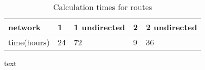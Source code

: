 

\begin{table}[]
\centering
\begin{tabular}{@{}l|llll@{}}
network     & 1           & 1 undirected & 2    & 2 undirected \\ \hline
time(hours) & 24 & 72  & 9 & 36
\end{tabular}
\caption{Calculation times for routes}
\label{table:net_calc_times}
\end{table}



text